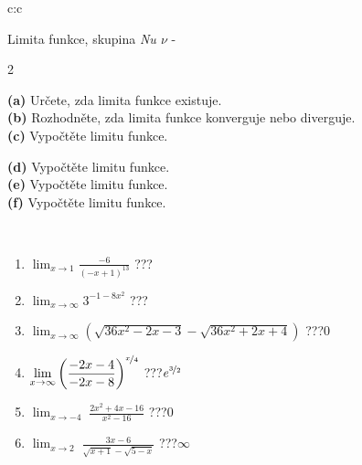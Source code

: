 \documentclass[10pt]{report}
\begin{document}
\begin{tabular}{c:c}
\begin{minipage}[c][104.5mm][t]{0.5\linewidth}
\begin{center}
\vspace{7mm}
{\huge Limita funkce, skupina \textit{Nu $\nu$} -}\\[5mm]
\begin{minipage}{0.95\linewidth}
\begin{center}
{\small \begin{multicols}{2} \raggedright
\textbf{(a)} Určete, zda limita funkce existuje. \\[1mm]
\textbf{(b)} Rozhodněte, zda limita funkce konverguje nebo diverguje. \\[1mm]
\textbf{(c)} Vypočtěte limitu funkce. \par \columnbreak
\textbf{(d)} Vypočtěte limitu funkce. \\[1mm]
\textbf{(e)} Vypočtěte limitu funkce. \\[1mm]
\textbf{(f)} Vypočtěte limitu funkce. \\[1mm]
\end{multicols}
}
\end{center}
\end{minipage}
\\[4mm]
\begin{minipage}{0.79\linewidth}
\begin{center}
\begin{varwidth}{\linewidth}
\begin{enumerate}
\normalsize
\item $\displaystyle\lim_{x\to1}{\frac{-6}{(-x+1)^{13}}}$\quad \dotfill\; ???\;\dotfill \quad {}
\item $\displaystyle\lim_{x\to\infty}{3^{-1-8x^2}}$\quad \dotfill\; ???\;\dotfill \quad {}
\item $\displaystyle\lim_{x\to\infty}{\left(\sqrt{36x^2-2x-3} - \sqrt{36x^2+2x+4}\right)}$\quad \dotfill\; ???\;\dotfill \quad $0$
\item $\displaystyle\lim_{x\to\infty}{\left( \frac{-2x-4}{-2x-8} \right)^{\nicefrac{x}{4}}}$\quad \dotfill\; ???\;\dotfill \quad $e^{\nicefrac{3}{2}}$
\item $\displaystyle\lim_{x\to -4}{\;\frac{2x^2+4x-16}{x^2-16}}$\quad \dotfill\; ???\;\dotfill \quad $0$
\item $\displaystyle\lim_{x\to 2}{\;\frac{3x-6}{\sqrt{x+1} - \sqrt{5-x}}}$\quad \dotfill\; ???\;\dotfill \quad $\infty$
\end{enumerate}

\end{varwidth}
\end{center}
\end{minipage}
\end{center}
\end{minipage}
\end{tabular}
\end{document}
